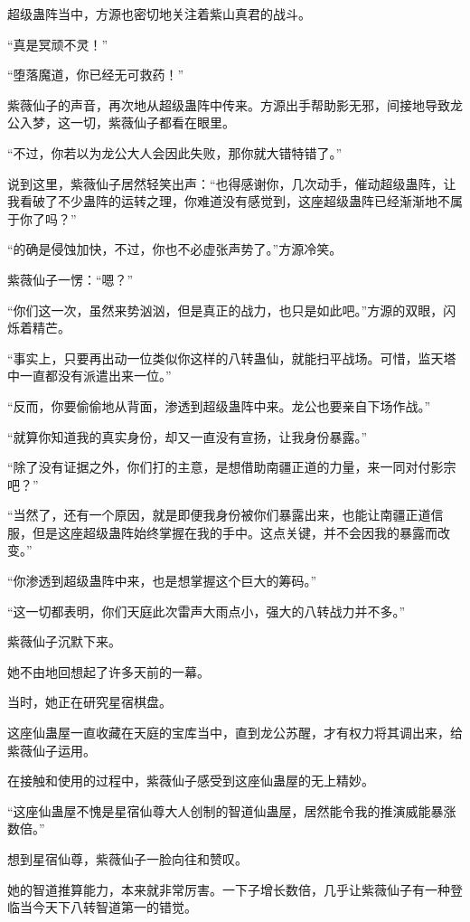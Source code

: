 \begin{this_body}
超级蛊阵当中，方源也密切地关注着紫山真君的战斗。

“真是冥顽不灵！”

“堕落魔道，你已经无可救药！”

紫薇仙子的声音，再次地从超级蛊阵中传来。方源出手帮助影无邪，间接地导致龙公入梦，这一切，紫薇仙子都看在眼里。

“不过，你若以为龙公大人会因此失败，那你就大错特错了。”

说到这里，紫薇仙子居然轻笑出声：“也得感谢你，几次动手，催动超级蛊阵，让我看破了不少蛊阵的运转之理，你难道没有感觉到，这座超级蛊阵已经渐渐地不属于你了吗？”

“的确是侵蚀加快，不过，你也不必虚张声势了。”方源冷笑。

紫薇仙子一愣：“嗯？”

“你们这一次，虽然来势汹汹，但是真正的战力，也只是如此吧。”方源的双眼，闪烁着精芒。

“事实上，只要再出动一位类似你这样的八转蛊仙，就能扫平战场。可惜，监天塔中一直都没有派遣出来一位。”

“反而，你要偷偷地从背面，渗透到超级蛊阵中来。龙公也要亲自下场作战。”

“就算你知道我的真实身份，却又一直没有宣扬，让我身份暴露。”

“除了没有证据之外，你们打的主意，是想借助南疆正道的力量，来一同对付影宗吧？”

“当然了，还有一个原因，就是即便我身份被你们暴露出来，也能让南疆正道信服，但是这座超级蛊阵始终掌握在我的手中。这点关键，并不会因我的暴露而改变。”

“你渗透到超级蛊阵中来，也是想掌握这个巨大的筹码。”

“这一切都表明，你们天庭此次雷声大雨点小，强大的八转战力并不多。”

紫薇仙子沉默下来。

她不由地回想起了许多天前的一幕。

当时，她正在研究星宿棋盘。

这座仙蛊屋一直收藏在天庭的宝库当中，直到龙公苏醒，才有权力将其调出来，给紫薇仙子运用。

在接触和使用的过程中，紫薇仙子感受到这座仙蛊屋的无上精妙。

“这座仙蛊屋不愧是星宿仙尊大人创制的智道仙蛊屋，居然能令我的推演威能暴涨数倍。”

想到星宿仙尊，紫薇仙子一脸向往和赞叹。

她的智道推算能力，本来就非常厉害。一下子增长数倍，几乎让紫薇仙子有一种登临当今天下八转智道第一的错觉。


\end{this_body}
